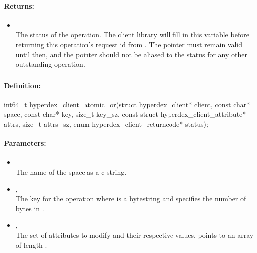 \paragraph{Returns:}
\begin{itemize}[noitemsep]
\item {}\\
The status of the operation.  The client library will fill in this variable before returning this operation's request id from .  The pointer must remain valid until then, and the pointer should not be aliased to the status for any other outstanding operation.
\end{itemize}

\pagebreak
\subsubsection{}
\label{api:c:atomic_or}


\paragraph{Definition:}
\begin{ccode}
int64_t hyperdex_client_atomic_or(struct hyperdex_client* client,
        const char* space,
        const char* key, size_t key_sz,
        const struct hyperdex_client_attribute* attrs, size_t attrs_sz,
        enum hyperdex_client_returncode* status);
\end{ccode}

\paragraph{Parameters:}
\begin{itemize}[noitemsep]
\item {}\\
The name of the space as a c-string.
\item {}, \\
The key for the operation where  is a bytestring and  specifies the number of bytes in .
\item {}, \\
The set of attributes to modify and their respective values.   points to an array of length .
\end{itemize}

